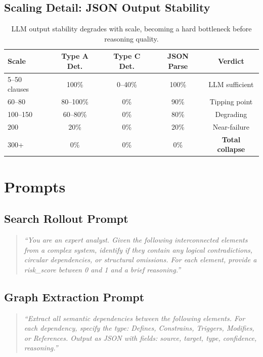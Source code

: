 \documentclass{article}
\begin{document}
\subsection{Scaling Detail: JSON Output Stability}

\begin{table}[h]
\caption{LLM output stability degrades with scale, becoming a hard bottleneck before reasoning quality.}
\centering
\small
\begin{tabular}{lcccc}
\toprule
\textbf{Scale} & \textbf{Type A Det.} & \textbf{Type C Det.} & \textbf{JSON Parse} & \textbf{Verdict} \\
\midrule
5--50 clauses & 100\% & 0--40\% & 100\% & LLM sufficient \\
60--80 & 80--100\% & 0\% & 90\% & Tipping point \\
100--150 & 60--80\% & 0\% & 80\% & Degrading \\
200 & 20\% & 0\% & 20\% & Near-failure \\
300+ & 0\% & 0\% & 0\% & \textbf{Total collapse} \\
\bottomrule
\end{tabular}
\end{table}

\section{Prompts}

\subsection{Search Rollout Prompt}
\begin{quote}
\small\textit{``You are an expert analyst. Given the following interconnected elements from a complex system, identify if they contain any logical contradictions, circular dependencies, or structural omissions. For each element, provide a risk\_score between 0 and 1 and a brief reasoning.''}
\end{quote}

\subsection{Graph Extraction Prompt}
\begin{quote}
\small\textit{``Extract all semantic dependencies between the following elements. For each dependency, specify the type: Defines, Constrains, Triggers, Modifies, or References. Output as JSON with fields: source, target, type, confidence, reasoning.''}
\end{quote}
\end{document}
